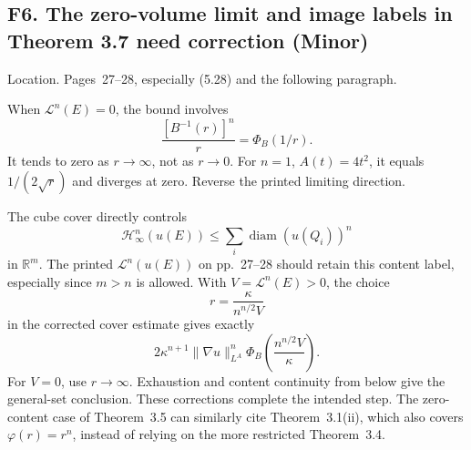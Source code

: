 \documentclass[10pt]{article}
\begin{document}
\subsection*{F6. The zero-volume limit and image labels in Theorem 3.7 need correction (Minor)}
Location. Pages 27–28, especially (5.28) and the following paragraph.\par
When \(\mathcal L^n(E)=0\), the bound involves \[\frac{[B^{-1}(r)]^n}{r}=\Phi_B(1/r).\] It tends to zero as \(r\to\infty\), not as \(r\to0\). For \(n=1\), \(A(t)=4t^2\), it equals \(1/(2\sqrt r)\) and diverges at zero. Reverse the printed limiting direction.\par
The cube cover directly controls \[\mathcal H_\infty^n(u(E))\le\sum_i\operatorname{diam}(u(Q_i))^n\] in \(\mathbb R^m\). The printed \(\mathcal L^n(u(E))\) on pp. 27–28 should retain this content label, especially since \(m>n\) is allowed. With \(V=\mathcal L^n(E)>0\), the choice \[r=\frac{\kappa}{n^{n/2}V}\] in the corrected cover estimate gives exactly \[2\kappa^{n+1}\|\nabla u\|_{L^A}^n
 \Phi_B\!\left(\frac{n^{n/2}V}{\kappa}\right).\] For \(V=0\), use \(r\to\infty\). Exhaustion and content continuity from below give the general-set conclusion. These corrections complete the intended step. The zero-content case of Theorem 3.5 can similarly cite Theorem 3.1(ii), which also covers \(\varphi(r)=r^n\), instead of relying on the more restricted Theorem 3.4.\par
\end{document}
